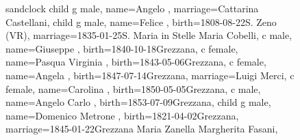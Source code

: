 \documentclass{article}
\begin{document}
\begin{figure}
\begin{minipage}[b]{0.19\textwidth}
\end{minipage}

\hfill
\begin{minipage}[b]{0.49\textwidth}
\centering

    \begin{genealogypicture}[
        processing=database,
        database format=full,
        node size=3.5cm,
        level size=2.8cm,
        level distance=6mm,
        list separators hang=3mm,
        name font=\bfseries,
        surn code={\textcolor{black!50!black}{#1}},
        place text={\newline}{},
        date format=d month yyyy,
        tcbset={male/.style={colframe=blue,colback=blue!5},
        female/.style={colframe=red,colback=red!5}},
        box={fit basedim=7pt,boxsep=2pt,segmentation style=solid,
            halign=left,before upper=\parskip1pt,
            \gtrDBsex,
        },
    ]
    sandclock
    {
        child{
            g{
                male,
                name={Angelo },
                marriage={Cattarina Castellani}{},
            }
            child{
                g{
                    male,
                    name={Felice },
                    birth={1808-08-22}{S. Zeno (VR)},
                    marriage={1835-01-25}{S. Maria in Stelle \newline Maria Cobelli},
                }
                c{
                    male,
                    name={Giuseppe },
                    birth={1840-10-18}{Grezzana},
                }
                c{
                    female,
                    name={Pasqua Virginia },
                    birth={1843-05-06}{Grezzana},
                }
                c{
                    female,
                    name={Angela },
                    birth={1847-07-14}{Grezzana},
                    marriage={Luigi Merci}{},
                }
                c{
                    female,
                    name={Carolina },
                    birth={1850-05-05}{Grezzana},
                }
                c{
                    male,
                    name={Angelo Carlo },
                    birth={1853-07-09}{Grezzana},
                }
            }
            child{
                g{
                    male,
                    name={Domenico Metrone },
                    birth={1821-04-02}{Grezzana},
                    marriage={1845-01-22}{Grezzana \newline Maria Zanella \newline Margherita Fasani},
}}}}
\end{genealogypicture}
\end{minipage}
\end{figure}
\end{document}
